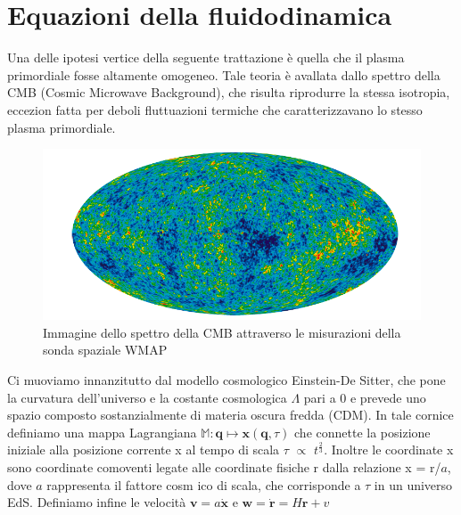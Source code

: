 \section{Equazioni della fluidodinamica}


Una delle ipotesi vertice della seguente trattazione è quella che il plasma primordiale fosse altamente omogeneo.
Tale teoria è avallata dallo spettro della CMB (Cosmic Microwave Background), che risulta riprodurre la stessa
isotropia, eccezion fatta per deboli fluttuazioni termiche che caratterizzavano lo stesso plasma primordiale.

\begin{center}
	\begin{figure}[H]
		\centering
		\includegraphics[scale=0.5, angle=0]{cmb.png}
		\caption{Immagine dello spettro della CMB attraverso le misurazioni della sonda spaziale WMAP}
		\label{fig:cmb}
	\end{figure}
\end{center}

Ci muoviamo innanzitutto dal modello cosmologico Einstein-De Sitter, che pone la curvatura dell'universo
e la costante cosmologica $\Lambda$ pari a 0 e prevede uno spazio composto sostanzialmente di materia
oscura fredda (CDM).
In tale cornice definiamo una mappa Lagrangiana $\mathbb{M}: \bm{q} \mapsto \bm{x}(\bm{q}, \tau)$ che connette la posizione
iniziale alla posizione corrente x al tempo di scala $\tau$ $\propto$ $t^{\frac{2}{3}}$.
Inoltre le coordinate x sono coordinate comoventi legate alle coordinate fisiche r dalla relazione
x = r/$a$, dove $a$ rappresenta il fattore cosm
ico di scala, che corrisponde a $\tau$ in un universo
EdS.
Definiamo infine le velocità $\bm{v} = a \dot{\bm{x}}$ e $\bm{w} = \dot{\bm{r}} = H \bm{r} + v$

